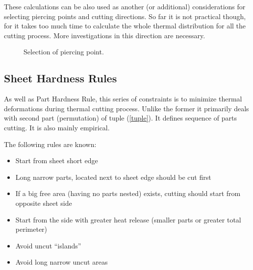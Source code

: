 \documentclass{../download/tPRS2e}
\begin{document}
These calculations can be also used as another (or additional) considerations for selecting piercing points and cutting directions.
So far it is not practical though, for it takes too much time to calculate the whole thermal distribution for all the cutting process.
More investigations in this direction are necessary.

\begin{figure}
\begin{center}
\caption{Selection of piercing point.}\label{thermals}
\end{center}
\end{figure}

\subsection{Sheet Hardness Rules}

As well as Part Hardness Rule, this series of constraints is to minimize thermal deformations during thermal cutting process.
Unlike the former it primarily deals with second part (permutation) of tuple (\ref{tuple}).
It defines sequence of parts cutting. It is also mainly empirical.

The following rules are known:

\begin{itemize}
\item Start from sheet short edge
\item Long narrow parts, located next to sheet edge should be cut first
\item If a big free area (having no parts nested) exists, cutting should start from opposite sheet side
\item Start from the side with greater heat release (smaller parts or greater total perimeter)
\item Avoid uncut “islands”
\item Avoid long narrow uncut areas
\end{itemize}
\end{document}
